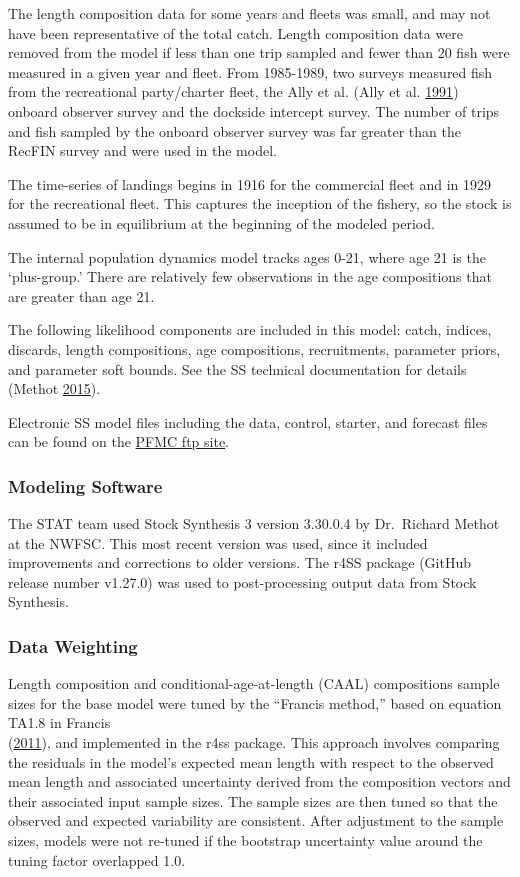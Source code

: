 \documentclass[12pt,]{article}
\begin{document}
The length composition data for some years and fleets was small, and may
not have been representative of the total catch. Length composition data
were removed from the model if less than one trip sampled and fewer than
20 fish were measured in a given year and fleet. From 1985-1989, two
surveys measured fish from the recreational party/charter fleet, the
Ally et al. (Ally et al. \protect\hyperlink{ref-Ally1991}{1991}) onboard
observer survey and the dockside intercept survey. The number of trips
and fish sampled by the onboard observer survey was far greater than the
RecFIN survey and were used in the model.

The time-series of landings begins in 1916 for the commercial fleet and
in 1929 for the recreational fleet. This captures the inception of the
fishery, so the stock is assumed to be in equilibrium at the beginning
of the modeled period.

The internal population dynamics model tracks ages 0-21, where age 21 is
the `plus-group.' There are relatively few observations in the age
compositions that are greater than age 21.

The following likelihood components are included in this model: catch,
indices, discards, length compositions, age compositions, recruitments,
parameter priors, and parameter soft bounds. See the SS technical
documentation for details (Methot
\protect\hyperlink{ref-Methot2015}{2015}).

Electronic SS model files including the data, control, starter, and
forecast files can be found on the
\href{ftp://ftp.pcouncil.org/pub/GF_STAR3_2017_Blue_Deacon_CAScorp/}{PFMC
ftp site}.

\subsubsection{Modeling Software}\label{modeling-software}

The STAT team used Stock Synthesis 3 version 3.30.0.4 by Dr.~Richard
Methot at the NWFSC. This most recent version was used, since it
included improvements and corrections to older versions. The r4SS
package (GitHub release number v1.27.0) was used to post-processing
output data from Stock Synthesis.

\subsubsection{Data Weighting}\label{data-weighting}

Length composition and conditional-age-at-length (CAAL) compositions
sample sizes for the base model were tuned by the ``Francis method,''
based on equation TA1.8 in Francis\\
(\protect\hyperlink{ref-Francis2011}{2011}), and implemented in the r4ss
package. This approach involves comparing the residuals in the model's
expected mean length with respect to the observed mean length and
associated uncertainty derived from the composition vectors and their
associated input sample sizes. The sample sizes are then tuned so that
the observed and expected variability are consistent. After adjustment
to the sample sizes, models were not re-tuned if the bootstrap
uncertainty value around the tuning factor overlapped 1.0.
\end{document}
